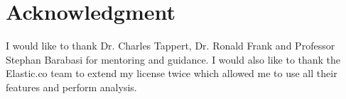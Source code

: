\documentclass[12pt,conference]{IEEEtran}
\begin{document}
%







\section*{Acknowledgment}

I would like to thank Dr. Charles Tappert, Dr. Ronald Frank and Professor Stephan Barabasi for mentoring and guidance. I would also like to thank the Elastic.co team to extend my license twice which allowed me to use all their features and perform analysis. 
\end{document}
